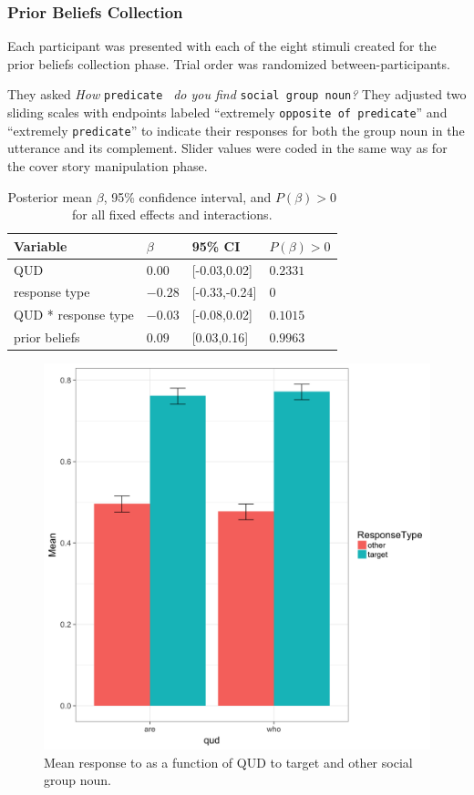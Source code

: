 \documentclass[11pt,a4paper]{article}
\begin{document}
\subsubsection{Prior Beliefs Collection}
Each participant was presented with each of the eight stimuli created for the prior beliefs collection phase. Trial order was randomized between-participants. 

They asked \textit{How }\texttt{predicate } \textit{do you find }\texttt{social group noun}\textit{?} They adjusted two sliding scales with endpoints labeled “extremely \texttt{opposite of predicate}” and “extremely \texttt{predicate}” to indicate their responses for both the group noun in the utterance and its complement. Slider values were coded in the same way as for the cover story manipulation phase.

\begin{table}
\centering
\begin{tabular}{llll}
  Variable & $\beta$ & 95\% CI&$P(\beta) > 0$\\
  \hline
  QUD & $0.00$ & {[}-0.03,0.02{]} &$0.2331$\\
  response type & $-0.28$ & {[}-0.33,-0.24{]} &$0$\\
  QUD * response type & $-0.03$ & {[}-0.08,0.02{]} &$0.1015$\\
  prior beliefs & $0.09$ & {[}0.03,0.16{]} &$0.9963$\\
\end{tabular}
\caption{Posterior mean $\beta$, 95\% confidence interval, and $P(\beta) > 0$ for all fixed effects and interactions.
  }
\end{table}

\begin{figure}[h]
\includegraphics[width=\linewidth]{qud_means.png}
\caption{Mean response to as a function of QUD to target and other social group noun.}
\label{means}
\end{figure}
\end{document}
